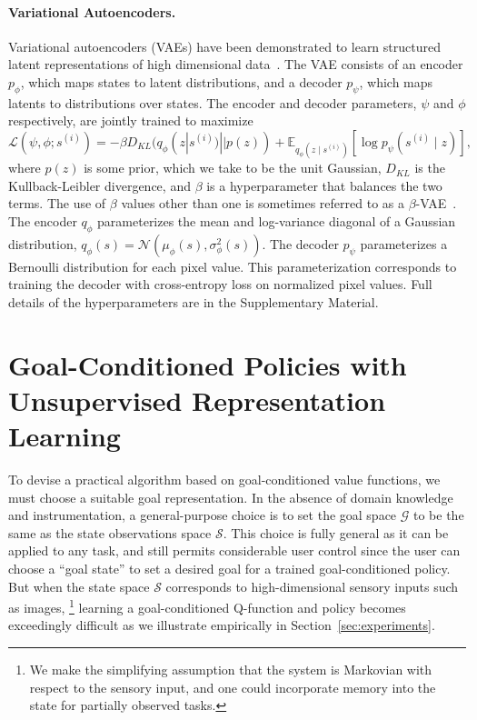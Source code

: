 \paragraph{Variational Autoencoders.}
Variational autoencoders (VAEs) have been demonstrated to learn structured latent representations of high dimensional data~\citep{kingma2014vae}.
The VAE consists of an encoder $p_\phi$, which maps states to latent distributions,
and a decoder $p_\psi$, which maps latents to distributions over states.
The encoder and decoder parameters, $\psi$ and $\phi$ respectively, are jointly trained to maximize
\begin{equation}\label{eq:vae-loss}
    \mathcal L (\psi, \phi; s^{(i)}) = - \beta D_{KL}(q_\phi(z | s^{(i)}) || p(z)) + \mathbb E_{q_\phi(z \mid s^{(i)})} [ \log p_\psi(s^{(i)} \mid z) ],
\end{equation}
where $p(z)$ is some prior, which we take to be the unit Gaussian, $D_{KL}$ is the Kullback-Leibler divergence, and $\beta$ is a hyperparameter that balances the two terms.
The use of $\beta$ values other than one is sometimes referred to as a $\beta$-VAE~\citep{higgins2016beta}.
The encoder $q_\phi$ parameterizes the mean and log-variance diagonal of a Gaussian distribution, $q_\phi(s) = \mathcal N(\mu_\phi(s), \sigma^2_\phi(s))$.
The decoder $p_\psi$ parameterizes a Bernoulli distribution for each pixel value.
This parameterization corresponds to training the decoder with cross-entropy loss on normalized pixel values.
Full details of the hyperparameters are in the Supplementary Material.

\section{Goal-Conditioned Policies with Unsupervised Representation Learning}
To devise a practical algorithm based on goal-conditioned value functions, we must choose a suitable goal representation.
In the absence of domain knowledge and instrumentation, a general-purpose choice is to set the goal space $\mathcal G$ to be the same as the state observations space $\mathcal S$.
This choice is fully general as it can be applied to any task, and still permits considerable user control since the user can choose a ``goal state'' to set a desired goal for a trained goal-conditioned policy.
But when the state space $\mathcal S$ corresponds to high-dimensional sensory inputs
such as images,
\setcounter{footnote}{0}
\footnote{We make the simplifying assumption that the system is Markovian with respect to the sensory input, and one could incorporate memory into the state for partially observed tasks.}
learning a goal-conditioned Q-function and policy becomes exceedingly difficult as we illustrate empirically in Section~\ref{sec:experiments}.

